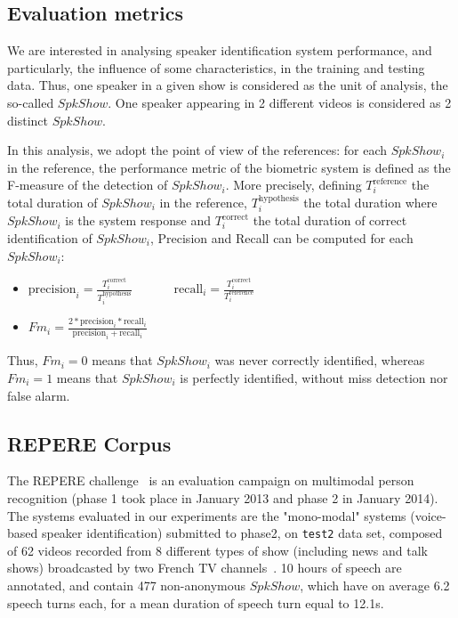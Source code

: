 
\subsection{Evaluation metrics}
\vspace*{-0.1cm}
We are interested in analysing speaker identification system performance, and particularly, the influence of some characteristics, in the training and testing data. Thus, one speaker in a given show is considered as the unit of analysis, the so-called $SpkShow$. One speaker appearing in 2 different videos is considered as 2 distinct $SpkShow$. 

In this analysis, we adopt the point of view of the references: for each $SpkShow_i$ in the reference, the performance metric of the biometric system is defined as the F-measure of the detection of $SpkShow_i$. More precisely, defining $T^{\text{reference}}_i$ the total duration of $SpkShow_i$ in the reference, $T^{\text{hypothesis}}_i$ the total duration where $SpkShow_i$ is the system response and $T^{\text{correct}}_i$ the total duration of correct identification of $SpkShow_i$, Precision and Recall can be computed for each $SpkShow_i$:
\begin{itemize}
\item $\text{precision}_i=\frac{T^{\text{correct}}_i}{T^{\text{hypothesis}}_i}$ ~~~~~~$\text{recall}_i=\frac{T^{\text{correct}}_i}{T^{\text{reference}}_i}$
\item $Fm_i=\frac{2*\text{precision}_i*\text{recall}_i}{\text{precision}_i+\text{recall}_i}$
\end{itemize} 

Thus, $Fm_i=0$ means that $SpkShow_i$ was never correctly identified, whereas $Fm_i=1$ means that $SpkShow_i$ is perfectly identified, without miss detection nor false alarm.

\subsection{REPERE Corpus}

The REPERE challenge~\cite{KAHN--CBMI--2012} is an evaluation campaign on multimodal person recognition (phase 1 took place in January 2013 and phase 2 in January 2014).  The systems evaluated in our experiments are the "mono-modal" systems (voice-based speaker identification) submitted to phase2, on \texttt{test2} data set, composed of 62 videos recorded from 8 different types of show (including news and talk shows) broadcasted by two French TV channels~\cite{Giraudel2012}. 10 hours of speech are annotated, and contain 477 non-anonymous $SpkShow$, which have on average 6.2 speech turns each, for a mean duration of speech turn equal to 12.1s.


